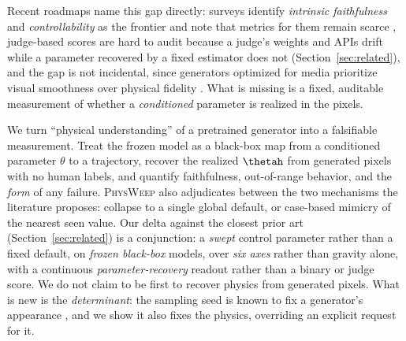 \documentclass[10pt,twocolumn,letterpaper]{article}
\begin{document}
Recent roadmaps name this gap directly: surveys identify \emph{intrinsic
faithfulness} and \emph{controllability} as the frontier and note that
metrics for them remain scarce
\citep{roadmap2025visualworld,evolution2026videogen}, judge-based scores
are hard to audit because a judge's weights and APIs drift while a
parameter recovered by a fixed estimator does not
(Section~\ref{sec:related}), and the gap is not incidental, since
generators optimized for media prioritize visual smoothness over physical
fidelity \citep{embodiedworld2026}. What is missing is a fixed, auditable
measurement of whether a \emph{conditioned} parameter is realized in the
pixels.

We turn ``physical understanding'' of a pretrained generator into a
falsifiable measurement. Treat the frozen model as a black-box map from a
conditioned parameter $\theta$ to a trajectory, recover the realized
$\thetah$ from generated pixels with no human labels, and quantify
faithfulness, out-of-range behavior, and the \emph{form} of any failure.
\textsc{PhysWeep} also adjudicates between the two mechanisms the literature
proposes: collapse to a single global default, or case-based mimicry of the
nearest seen value. Our delta against the closest prior art
(Section~\ref{sec:related}) is a conjunction: a \emph{swept} control
parameter rather than a fixed default, on \emph{frozen black-box} models,
over \emph{six axes} rather than gravity alone, with a continuous
\emph{parameter-recovery} readout rather than a binary or judge score. We
do not claim to be first to recover physics from generated pixels. What is
new is the \emph{determinant}: the sampling seed is known to fix a
generator's appearance \citep{xu2025goodseed}, and we show it also fixes
the physics, overriding an explicit request for it.
\end{document}
